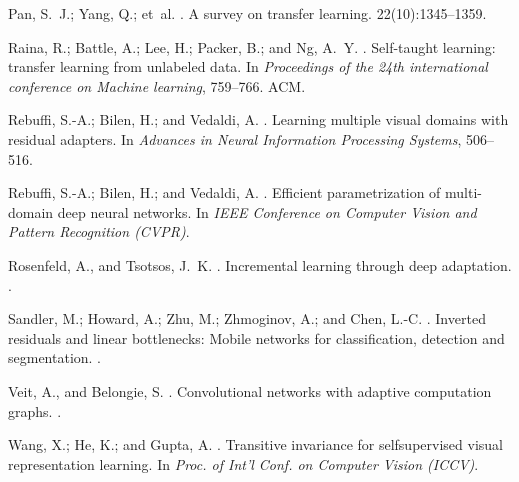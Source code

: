 \documentclass[letterpaper]{article} \usepackage{aaai19}  \usepackage{times}  \usepackage{helvet}  \usepackage{courier}  \usepackage{url}  \usepackage{graphicx}  \usepackage{amssymb}
\begin{document}
\begin{thebibliography}{}
Pan, S.~J.; Yang, Q.; et~al.
.
\newblock A survey on transfer learning.
  22(10):1345--1359.

Raina, R.; Battle, A.; Lee, H.; Packer, B.; and Ng, A.~Y.
.
\newblock Self-taught learning: transfer learning from unlabeled data.
\newblock In {\em Proceedings of the 24th international conference on Machine
  learning},  759--766.
\newblock ACM.

Rebuffi, S.-A.; Bilen, H.; and Vedaldi, A.
.
\newblock Learning multiple visual domains with residual adapters.
\newblock In {\em Advances in Neural Information Processing Systems},
  506--516.

Rebuffi, S.-A.; Bilen, H.; and Vedaldi, A.
.
\newblock Efficient parametrization of multi-domain deep neural networks.
\newblock In {\em IEEE Conference on Computer Vision and Pattern Recognition
  (CVPR)}.

Rosenfeld, A., and Tsotsos, J.~K.
.
\newblock Incremental learning through deep adaptation.
.

Sandler, M.; Howard, A.; Zhu, M.; Zhmoginov, A.; and Chen, L.-C.
.
\newblock Inverted residuals and linear bottlenecks: Mobile networks for
  classification, detection and segmentation.
.

Veit, A., and Belongie, S.
.
\newblock Convolutional networks with adaptive computation graphs.
.

Wang, X.; He, K.; and Gupta, A.
.
\newblock Transitive invariance for selfsupervised visual representation
  learning.
\newblock In {\em Proc. of Int’l Conf. on Computer Vision (ICCV)}.


\end{thebibliography}
\end{document}
